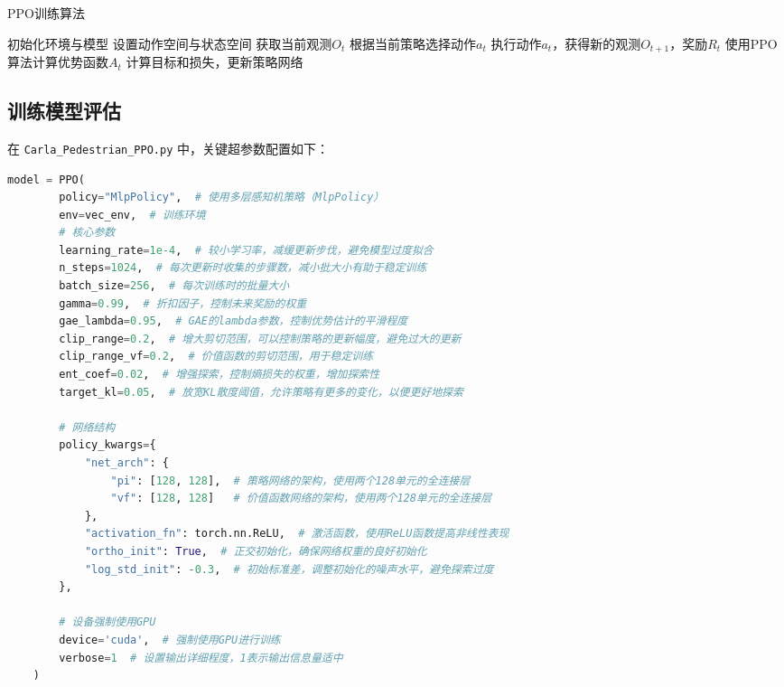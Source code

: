 \begin{algorithm}[H]
    \caption{PPO训练算法}
    \begin{algorithmic}[1]
    \STATE 初始化环境与模型
    \STATE 设置动作空间与状态空间
        \STATE 获取当前观测$O_t$
            \STATE 根据当前策略选择动作$a_t$
            \STATE 执行动作$a_t$，获得新的观测$O_{t+1}$，奖励$R_t$
            \STATE 使用PPO算法计算优势函数$A_t$
            \STATE 计算目标和损失，更新策略网络
        \ENDFOR
    \ENDWHILE
    \end{algorithmic}
\end{algorithm}

\subsection{训练模型评估}
在 \texttt{Carla\_Pedestrian\_PPO.py} 中，关键超参数配置如下：
\begin{lstlisting}[language=Python]
model = PPO(
        policy="MlpPolicy",  # 使用多层感知机策略（MlpPolicy）
        env=vec_env,  # 训练环境
        # 核心参数
        learning_rate=1e-4,  # 较小学习率，减缓更新步伐，避免模型过度拟合
        n_steps=1024,  # 每次更新时收集的步骤数，减小批大小有助于稳定训练
        batch_size=256,  # 每次训练时的批量大小
        gamma=0.99,  # 折扣因子，控制未来奖励的权重
        gae_lambda=0.95,  # GAE的lambda参数，控制优势估计的平滑程度
        clip_range=0.2,  # 增大剪切范围，可以控制策略的更新幅度，避免过大的更新
        clip_range_vf=0.2,  # 价值函数的剪切范围，用于稳定训练
        ent_coef=0.02,  # 增强探索，控制熵损失的权重，增加探索性
        target_kl=0.05,  # 放宽KL散度阈值，允许策略有更多的变化，以便更好地探索

        # 网络结构
        policy_kwargs={
            "net_arch": {
                "pi": [128, 128],  # 策略网络的架构，使用两个128单元的全连接层
                "vf": [128, 128]   # 价值函数网络的架构，使用两个128单元的全连接层
            },
            "activation_fn": torch.nn.ReLU,  # 激活函数，使用ReLU函数提高非线性表现
            "ortho_init": True,  # 正交初始化，确保网络权重的良好初始化
            "log_std_init": -0.3,  # 初始标准差，调整初始化的噪声水平，避免探索过度
        },

        # 设备强制使用GPU
        device='cuda',  # 强制使用GPU进行训练
        verbose=1  # 设置输出详细程度，1表示输出信息量适中
    )

\end{lstlisting}


